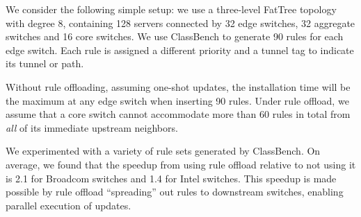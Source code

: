 We consider the following simple setup: we use a three-level FatTree topology~\cite{fattree-sigcomm08} with degree 8, containing 128 servers connected by 32 edge switches, 32 aggregate switches and 16 core switches.  We use ClassBench to generate 90 rules for each edge switch. Each rule is assigned a different priority and a tunnel tag to indicate its tunnel or path. 

Without rule offloading, assuming one-shot updates, the installation time will be the maximum at any edge switch when inserting 90 rules. Under rule offload, we assume that a core switch cannot accommodate more than 60 rules in total from {\em all} of its immediate upstream neighbors.

We experimented with a variety of rule sets generated by ClassBench. On average, we found that the speedup from using rule offload relative to not using it is 2.1 for Broadcom switches and 1.4 for Intel switches. This speedup is made possible by rule offload ``spreading'' out rules to downstream switches, enabling parallel execution of updates. 




